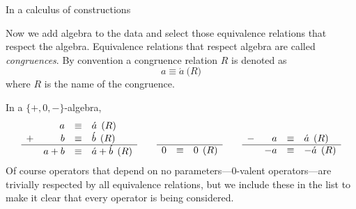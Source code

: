 \begin{theorem}
    In a calculus of constructions
    \begin{center}
    \end{center}
\end{theorem}

Now we add algebra to the data and select those equivalence relations that respect the algebra.
Equivalence relations that respect algebra are called \emph{congruences}.
By convention a congruence relation $R$ is denoted as 
\[  
    a\equiv\acute{a}\pod{R}
\]
where $R$ is the name of the congruence.
\begin{example}
    In a $\{+,0,-\}$-algebra,
    \[
        \begin{array}{crcl}
            & a & \equiv & \acute{a} \pod{R}\\
        + &  b & \equiv & \acute{b} \pod{R}\\
        \hline 
            & a+b & \equiv & \acute{a}+\acute{b}\pod{R}
        \end{array}
        \qquad 
        \begin{array}{rcl}
            \\
            \\
        \hline 
            0 & \equiv& 0 \pod{R}
        \end{array}
        \qquad 
        \begin{array}{crcl}
            \\
        -   & a & \equiv & \acute{a} \pod{R}\\
        \hline 
            &  -a & \equiv & -\acute{a} \pod{R}
        \end{array}
    \]
    Of course operators that depend on no parameters---0-valent operators---are 
    trivially respected by all equivalence relations, but we include these 
    in the list to make it clear that every operator is being considered.
\end{example}

